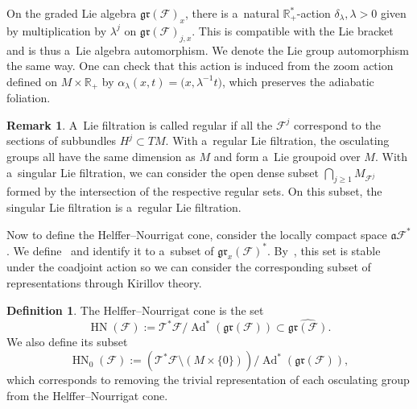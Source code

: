 \documentclass[10pt,a4paper]{article}
\newcommand{\R}{\mathbb R} %
\newcommand{\F}{\mathcal{F}} %
\newcommand{\Ad}{\operatorname{Ad}} %
\newcommand{\adiab}{\mathfrak{a}} %
\newcommand{\T}{\mathcal{T}} %
\newcommand{\HN}{\operatorname{HN}} %
\newcommand{\Fb}{\mathcal{F}} %
\newcommand{\gr}{\mathfrak{gr}} %
\numberwithin{equation}{section}
\theoremstyle{definition}
\newtheorem{mydef}[thm]{Definition}
\newtheorem{rem}[thm]{Remark}
\begin{document}
On the graded Lie algebra $\gr(\F)_x$, there is a~natural $\R^*_+$-action $\delta_{\lambda}, \lambda>0$ given by multiplication by $\lambda^j$ on $\gr(\Fb)_{j,x}$. This is compatible with the Lie bracket and is thus a~Lie algebra automorphism. We denote the Lie group automorphism the same way. One can check that this action is induced from the zoom action defined on $M \times \R_+$ by $\alpha_{\lambda}(x,t) = \bigl(x,\lambda^{-1}t\bigr)$, which preserves the adiabatic foliation.

\begin{rem}
 A~Lie filtration is called regular if all the $\F^j$ correspond to the sections of subbundles $H^j \subset TM$. With a~regular Lie filtration, the osculating groups all have the same dimension as $M$ and form a~Lie groupoid over $M$. With a~singular Lie filtration, we can consider the open dense subset $\bigcap_{j\geq 1} M_{\F^j}$ formed by the intersection of the respective regular sets. On this subset, the singular Lie filtration is a~regular Lie filtration.
\end{rem}

Now to define the Helffer--Nourrigat cone, consider the locally compact space $\adiab\F^*$. We define~\smash{$\T^*_x\F := \overline{T^*M\times \R^*_+} \cap \adiab\F^*_{(x,0)}$}
and identify it to a~subset of $\gr_x(\Fb)^*$. By~\cite[Proposition~1.12]{AMYMaximalHypoellipticity}, this set is stable under the coadjoint action so we can consider the corresponding subset of representations through Kirillov theory.

\begin{mydef}\label{Def: ConeHF Intrinsic}
 The Helffer--Nourrigat cone is the set
 \[\HN(\Fb) := {\T^*\F}/{\Ad^*(\gr(\Fb))} \subset \widehat{\gr(\Fb)}.\]
 We also define its subset
 \[\HN_0(\Fb) := {(\T^*\F\setminus (M\times \{0\}))}/{\Ad^*(\gr(\Fb))},\]
 which corresponds to removing the trivial representation of each osculating group from the Helffer--Nourrigat cone.
\end{mydef}
\end{document}
